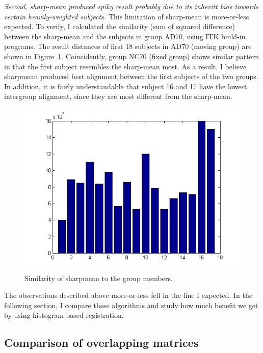 \documentclass[preprint,review,12pt]{elsarticle}
\begin{document}
{\it Second, sharp-mean produced spiky result probably due to its inheritt bias towards certain heavily-weighted subjects.} This limitation of sharp-mean is more-or-less expected. To verify, I calculated the similarity (sum of squared difference) between the sharp-mean and the subjects in group AD70, using ITK build-in programs. The result distances of first 18 subjects in AD70 (moving group) are shown in Figure~\ref{fig:sharpmean_similarity}. Coincidently, group NC70 (fixed group) shows similar pattern in that the first subject resembles the sharp-mean most. As a result, I believe sharpmean produced best alignment between the first subjects of the two groups. In addition, it is fairly understandable that subject 16 and 17 have the lowest intergroup alignment, since they are most different from the sharp-mean.

\begin{figure}
\begin{center}
\includegraphics[width=.9\columnwidth]{figs/sharpmean_similarity.png}
\end{center}
\caption{Similarity of sharpmean to the group members.}
\label{fig:sharpmean_similarity}
\end{figure}

The observations described above more-or-less fell in the line I expected. In the following section, I compare these algorithms and study how much benefit we get by using histogram-based registration.

\subsection{Comparison of overlapping matrices}
\end{document}
